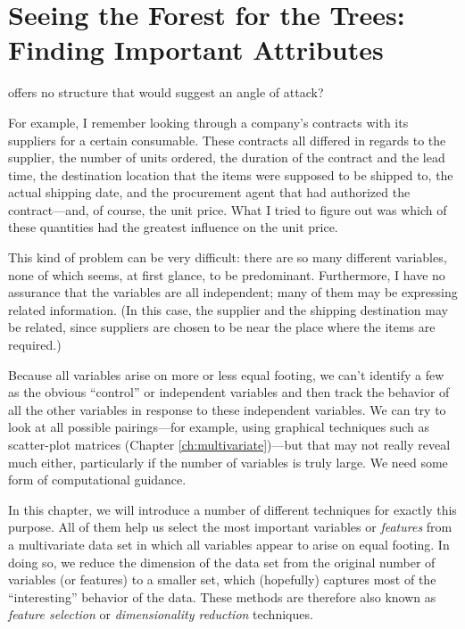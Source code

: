 

\chapter[Seeing the Forest for the Trees]{Seeing the Forest for the
  Trees: Finding Important Attributes}{}{}
\label{ch:reduction}

  
 offers no structure that would suggest an
angle of attack?

For example, I remember looking through a company's contracts with its
suppliers for a certain consumable. These contracts all differed in
regards to the supplier, the number of units ordered, the duration of
the contract and the lead time, the destination location that the
items were supposed to be shipped to, the actual shipping date, and
the procurement agent that had authorized the contract---and, of
course, the unit price. What I tried to figure out was which of these
quantities had the greatest influence on the unit price.

This kind of problem can be very difficult: there are so many
different variables, none of which seems, at first glance, to be
predominant. Furthermore, I have no assurance that the variables are
all independent; many of them may be expressing related information.
(In this case, the supplier and the shipping destination may be
related, since suppliers are chosen to be near the place where the
items are required.)

Because all variables arise on more or less equal footing, we can't
identify a few as the obvious ``control'' or independent variables and
then track the behavior of all the other variables in response to
these independent variables. We can try to look at all possible
pairings---for example, using graphical techniques such as
scatter-plot matrices (Chapter \ref{ch:multivariate})---but that may
not really reveal much either, particularly if the number of
variables is truly large. We need some form of computational guidance.

In this chapter, we will introduce a number of different techniques for
exactly this purpose. All of them help us select the most important
variables or \emph{features} from a multivariate data set in which all
variables appear to arise\vadjust{\pagebreak} on equal footing. In doing so, we
reduce the dimension of the data set from the original number of variables (or
features) to a smaller set, which (hopefully) captures most of the
``interesting'' behavior of the data. These methods are therefore also
known as \emph{feature selection} or \emph{dimensionality reduction}
techniques.

